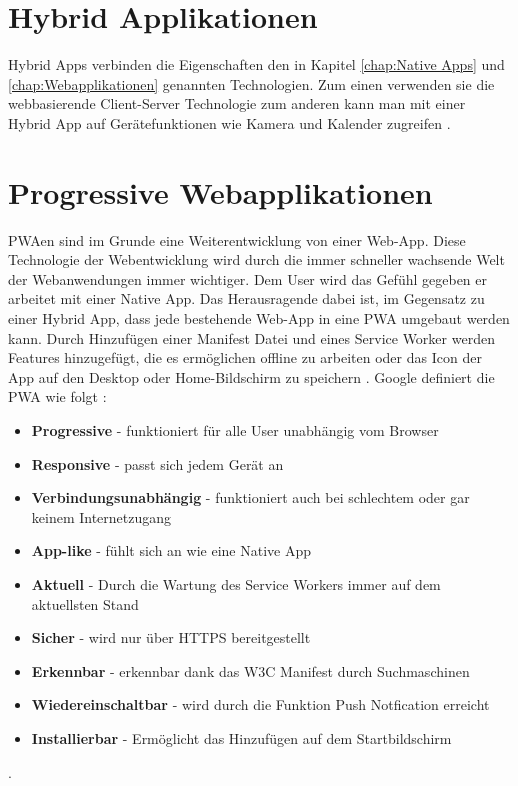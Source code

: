 \section{Hybrid Applikationen}
Hybrid Apps verbinden die Eigenschaften den in Kapitel \ref{chap:Native Apps} und \ref{chap:Webapplikationen} genannten Technologien. Zum einen verwenden sie die webbasierende Client-Server Technologie zum anderen kann man mit einer Hybrid App auf Gerätefunktionen wie Kamera und Kalender zugreifen \cite{HybridApps}. 

\section{Progressive Webapplikationen}\label{chap:ProgressiveWebapplikationen}
\acl{PWA}en sind im Grunde eine Weiterentwicklung von einer \acs{Web-App}. Diese Technologie der Webentwicklung wird durch die immer schneller wachsende Welt der Webanwendungen immer wichtiger. 
Dem User wird das Gefühl gegeben er arbeitet mit einer Native App. Das Herausragende dabei ist, im Gegensatz zu einer Hybrid App, dass jede bestehende \acs{Web-App} in eine \acs{PWA} umgebaut werden kann.
Durch Hinzufügen einer Manifest Datei und eines Service Worker werden Features hinzugefügt, die es ermöglichen offline zu arbeiten oder das Icon der App auf den Desktop oder Home-Bildschirm zu speichern \cite{PWA}.
Google definiert die \acs{PWA} wie folgt \cite{PWAAdjectives}:
\begin{itemize}
    \item  \textbf{Progressive} - funktioniert für alle User unabhängig vom Browser
	\item  \textbf{Responsive} - passt sich jedem Gerät an	
	\item  \textbf{Verbindungsunabhängig} - funktioniert auch bei schlechtem oder gar keinem Internetzugang
	\item  \textbf{App-like} - fühlt sich an wie eine Native App
	\item  \textbf{Aktuell} - Durch die Wartung des Service Workers immer auf dem aktuellsten Stand
	\item  \textbf{Sicher} - wird nur über HTTPS bereitgestellt
	\item  \textbf{Erkennbar} - erkennbar dank das W3C Manifest durch Suchmaschinen
	\item  \textbf{Wiedereinschaltbar} - wird durch die Funktion Push Notfication erreicht
	\item  \textbf{Installierbar} - Ermöglicht das Hinzufügen auf dem Startbildschirm
\end{itemize}. 


